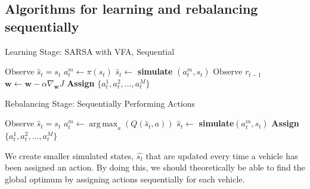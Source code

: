 \documentclass[letterpaper, 10 pt, conference]{ieeeconf}  %
\DeclareMathOperator*{\argmax}{arg\,max}
\begin{document}
\subsection{Algorithms for learning and rebalancing sequentially}
\begin{algorithm}[H]
\caption{Learning Stage: SARSA with VFA, Sequential}
\begin{algorithmic}
    \State Observe $\hat{s}_t=s_t$
            \State $a^m_t \leftarrow \pi(s_t)$ 
            \State $\hat{s}_t \leftarrow$ \textbf{simulate} $(a^m_t,s_t)$
        \EndIf
        \State Observe $r_{t-1}$
        \State $\textbf{w} \leftarrow \textbf{w} - \alpha \nabla_{ \textbf{w}} J$
    \EndFor
    \State\textbf{Assign} $\{a^1_t,a^2_t,...,a^M_t\}$
\EndFor
\end{algorithmic}
\end{algorithm}
\begin{algorithm}[H]
\caption{Rebalancing Stage: Sequentially Performing Actions}
\begin{algorithmic}
    \State Observe $\hat{s}_t=s_t$
            \State $a_t^m \leftarrow \argmax_a(Q(\hat{s}_t,a))$
            \State $\hat{s}_t \leftarrow$ \textbf{simulate}$(a^m_t,s_t)$
        \EndIf
    \EndFor
    \State\textbf{Assign}$\{a^1_t,a^2_t,...,a^M_t\}$
\EndFor
\end{algorithmic}
\end{algorithm}
We create smaller simulated states, $\hat{s_t}$ that are updated every time a vehicle has been assigned an action. By doing this, we should theoretically be able to find the global optimum by assigning actions sequentially for each vehicle. 



   
\end{document}
